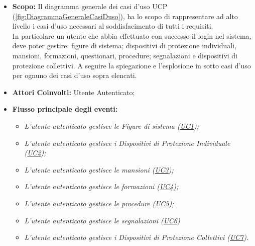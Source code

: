 	\begin{itemize}
		\item \textbf{Scopo:} Il diagramma generale dei casi d'uso UCP (\autoref{fig:DiagrammaGeneraleCasiDuso}), ha lo scopo di rappresentare ad alto livello i casi d'uso necessari al soddisfacimento di tutti i requisiti. \\
		In particolare un utente che abbia effettuato con successo il login nel sistema, deve poter gestire: figure di sistema; dispositivi di protezione individuali, mansioni, formazioni, questionari, procedure; segnalazioni e dispositivi di protezione collettivi.
		A seguire la spiegazione e l'esplosione in sotto casi d'uso per ognuno dei casi d'uso sopra elencati.
		\item \textbf{Attori Coinvolti:} Utente Autenticato;
		\item \textbf{Flusso principale degli eventi:} 
			\begin{itemize}
				\item \textit{L'utente autenticato gestisce le Figure di sistema (\hyperref[section:UC1]{UC1});}
				\item \textit{L'utente autenticato gestisce i Dispositivi di Protezione Individuale (\hyperref[section:UC2]{UC2});}
				\item \textit{L'utente autenticato gestisce le mansioni (\hyperref[section:UC3]{UC3});}
				\item \textit{L'utente autenticato gestisce le formazioni (\hyperref[section:UC4]{UC4});}
				\item \textit{L'utente autenticato gestisce le procedure (\hyperref[section:UC5]{UC5});}
				\item \textit{L'utente autenticato gestisce le segnalazioni (\hyperref[section:UC6]{UC6})}
				\item \textit{L'utente autenticato gestisce i Dispositivi di Protezione Collettivi (\hyperref[section:UC7]{UC7}).}
			\end{itemize}
	\end{itemize}
	

